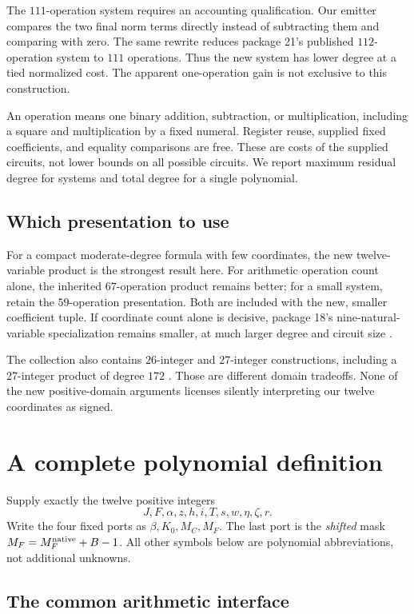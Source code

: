 \documentclass[11pt,a4paper]{article}
\theoremstyle{remark}\newtheorem{remark}[theorem]{Remark}
\begin{document}
The $111$-operation system requires an accounting qualification. Our
emitter compares the two final norm terms directly instead of subtracting
them and comparing with zero. The same rewrite reduces package 21's
published $112$-operation system to $111$ operations. Thus the new system
has lower degree at a tied normalized cost. The apparent one-operation
gain is not exclusive to this construction.

An operation means one binary addition, subtraction, or multiplication,
including a square and multiplication by a fixed numeral. Register reuse,
supplied fixed coefficients, and equality comparisons are free. These are
costs of the supplied circuits, not lower bounds on all possible circuits.
We report maximum residual degree for systems and total degree for a
single polynomial.

\subsection{Which presentation to use}

For a compact moderate-degree formula with few coordinates, the new
twelve-variable product is the strongest result here. For arithmetic
operation count alone, the inherited $67$-operation product remains better;
for a small system, retain the $59$-operation presentation. Both are
included with the new, smaller coefficient tuple. If coordinate count
alone is decisive, package 18's nine-natural-variable specialization
remains smaller, at much larger degree and circuit size \cite{jones9}.

The collection also contains $26$-integer and $27$-integer constructions,
including a $27$-integer product of degree $172$ \cite{catalogue}.
Those are different domain tradeoffs. None of the new positive-domain
arguments licenses silently interpreting our twelve coordinates as signed.

\section{A complete polynomial definition}
\label{sec:formula}

Supply exactly the twelve positive integers
\[
 J,F,\alpha,z,h,i,T,s,w,\eta,\zeta,r.
\]
Write the four fixed ports as $\beta,K_0,M_C,M_F$.
The last port is the \emph{shifted} mask
$M_F=M_F^{\rm native}+B-1$. All other symbols below are polynomial
abbreviations, not additional unknowns.

\subsection{The common arithmetic interface}
\end{document}
